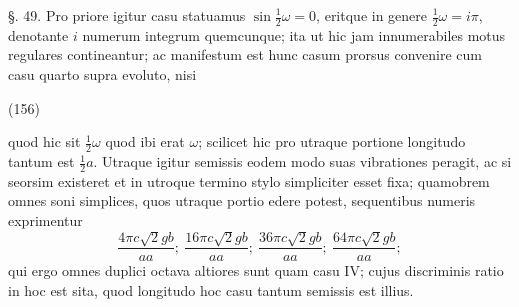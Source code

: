 \documentclass[11pt,a4paper]{article}
\begin{document}
§. 49. Pro priore igitur casu statuamus $\sin\frac{1}{2}\omega=0$, eritque
in genere $\frac{1}{2}\omega=i\pi$, denotante $i$ numerum integrum quemcunque; ita
ut hic jam innumerabiles motus regulares contineantur; ac manifestum
est hunc casum prorsus convenire cum casu quarto supra evoluto, nisi

(156)

quod hic sit $\frac{1}{2}\omega$ quod ibi erat $\omega$; scilicet hic pro utraque
portione longitudo tantum est $\frac{1}{2}a$. Utraque igitur semissis eodem
modo suas vibrationes peragit, ac si seorsim existeret et in utroque
termino stylo simpliciter esset fixa; quamobrem omnes soni simplices,
quos utraque portio edere potest, sequentibus numeris exprimentur
\[ \frac{4\pi c\surd 2gb}{aa};\ \frac{16\pi c\surd 2gb}{aa};\ \frac{36\pi c\surd 2gb}{aa};\ \frac{64\pi c\surd 2gb}{aa}; \]
qui ergo omnes duplici octava altiores sunt quam casu IV;
cujus discriminis ratio in hoc est sita, quod longitudo hoc
casu tantum semissis est illius.
\end{document}
